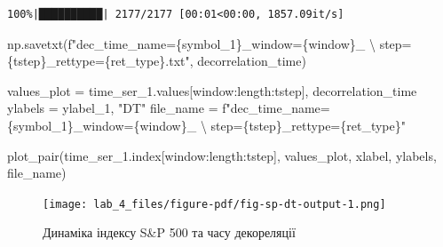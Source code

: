 \documentclass[
  letterpaper,
]{report}
\newenvironment{Shaded}{\begin{snugshade}}{\end{snugshade}}
\newcommand{\CharTok}[1]{\textcolor[rgb]{0.13,0.47,0.30}{#1}}
\newcommand{\NormalTok}[1]{\textcolor[rgb]{0.00,0.23,0.31}{#1}}
\newcommand{\OperatorTok}[1]{\textcolor[rgb]{0.37,0.37,0.37}{#1}}
\newcommand{\SpecialCharTok}[1]{\textcolor[rgb]{0.37,0.37,0.37}{#1}}
\newcommand{\SpecialStringTok}[1]{\textcolor[rgb]{0.13,0.47,0.30}{#1}}
\newcommand{\StringTok}[1]{\textcolor[rgb]{0.13,0.47,0.30}{#1}}
\begin{document}
\begin{verbatim}
100%|██████████| 2177/2177 [00:01<00:00, 1857.09it/s]
\end{verbatim}

\begin{Shaded}
\begin{Highlighting}[]
\NormalTok{np.savetxt(}\SpecialStringTok{f"dec\_time\_name=}\SpecialCharTok{\{}\NormalTok{symbol\_1}\SpecialCharTok{\}}\SpecialStringTok{\_window=}\SpecialCharTok{\{}\NormalTok{window}\SpecialCharTok{\}}\SpecialStringTok{\_ }\CharTok{\textbackslash{}}
\SpecialStringTok{    step=}\SpecialCharTok{\{}\NormalTok{tstep}\SpecialCharTok{\}}\SpecialStringTok{\_rettype=}\SpecialCharTok{\{}\NormalTok{ret\_type}\SpecialCharTok{\}}\SpecialStringTok{.txt"}\NormalTok{, decorrelation\_time)}
\end{Highlighting}
\end{Shaded}

\begin{Shaded}
\begin{Highlighting}[]
\NormalTok{values\_plot }\OperatorTok{=}\NormalTok{ time\_ser\_1.values[window:length:tstep], decorrelation\_time}
\NormalTok{ylabels }\OperatorTok{=}\NormalTok{ ylabel\_1, }\StringTok{"DT"}
\NormalTok{file\_name }\OperatorTok{=} \SpecialStringTok{f"dec\_time\_name=}\SpecialCharTok{\{}\NormalTok{symbol\_1}\SpecialCharTok{\}}\SpecialStringTok{\_window=}\SpecialCharTok{\{}\NormalTok{window}\SpecialCharTok{\}}\SpecialStringTok{\_ }\CharTok{\textbackslash{}}
\SpecialStringTok{    step=}\SpecialCharTok{\{}\NormalTok{tstep}\SpecialCharTok{\}}\SpecialStringTok{\_rettype=}\SpecialCharTok{\{}\NormalTok{ret\_type}\SpecialCharTok{\}}\SpecialStringTok{"}
\end{Highlighting}
\end{Shaded}

\begin{Shaded}
\begin{Highlighting}[]
\NormalTok{plot\_pair(time\_ser\_1.index[window:length:tstep], values\_plot, }
\NormalTok{            xlabel, ylabels, file\_name)}
\end{Highlighting}
\end{Shaded}

\begin{figure}[H]

{\centering \texttt{[image: lab\_4\_files/figure-pdf/fig-sp-dt-output-1.png]}

}

\caption{\label{fig-sp-dt}Динаміка індексу S\&P 500 та часу декореляції}

\end{figure}
\end{document}
